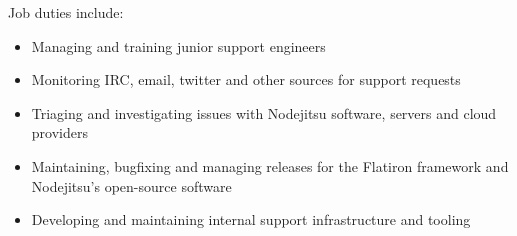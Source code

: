\normalsize
Job duties include:
\small
\begin{itemize}
    \item Managing and training junior support engineers
    \item Monitoring IRC, email, twitter and other sources for support requests
    \item Triaging and investigating issues with Nodejitsu software, servers and cloud providers
    \item Maintaining, bugfixing and managing releases for the Flatiron framework and Nodejitsu's open-source software
    \item Developing and maintaining internal support infrastructure and tooling
\end{itemize}
\normalsize
\medskip
